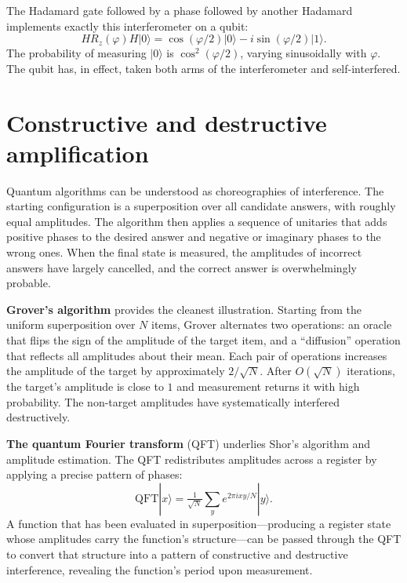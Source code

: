 The Hadamard gate followed by a phase followed by another Hadamard implements exactly this interferometer on a qubit:
\[
  H R_z(\varphi) H |0\rangle = \cos(\varphi/2)|0\rangle - i\sin(\varphi/2)|1\rangle.
\]
The probability of measuring $|0\rangle$ is $\cos^2(\varphi/2)$, varying sinusoidally with $\varphi$. The qubit has, in effect, taken both arms of the interferometer and self-interfered.

\section{Constructive and destructive amplification}

Quantum algorithms can be understood as choreographies of interference. The starting configuration is a superposition over all candidate answers, with roughly equal amplitudes. The algorithm then applies a sequence of unitaries that adds positive phases to the desired answer and negative or imaginary phases to the wrong ones. When the final state is measured, the amplitudes of incorrect answers have largely cancelled, and the correct answer is overwhelmingly probable.

\textbf{Grover's algorithm} \citep{grover_fast_1996} provides the cleanest illustration. Starting from the uniform superposition over $N$ items, Grover alternates two operations: an oracle that flips the sign of the amplitude of the target item, and a ``diffusion'' operation that reflects all amplitudes about their mean. Each pair of operations increases the amplitude of the target by approximately $2/\sqrt N$. After $O(\sqrt N)$ iterations, the target's amplitude is close to $1$ and measurement returns it with high probability. The non-target amplitudes have systematically interfered destructively.

\textbf{The quantum Fourier transform} (QFT) underlies Shor's algorithm and amplitude estimation. The QFT redistributes amplitudes across a register by applying a precise pattern of phases:
\[
  \mathrm{QFT}|x\rangle = \tfrac{1}{\sqrt{N}}\sum_y e^{2\pi i xy / N}|y\rangle.
\]
A function that has been evaluated in superposition---producing a register state whose amplitudes carry the function's structure---can be passed through the QFT to convert that structure into a pattern of constructive and destructive interference, revealing the function's period upon measurement.

